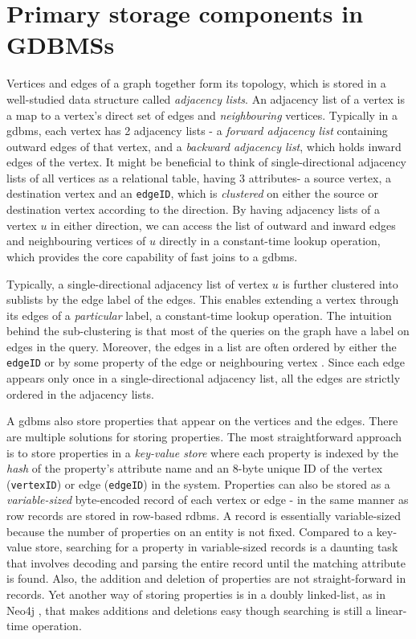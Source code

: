 \section{Primary storage components in GDBMSs}
\label{sec:storage-components}

Vertices and edges of a graph together form its topology, which is stored in a well-studied data structure called \emph{adjacency lists}. An adjacency list of a vertex is a map to a vertex's direct set of edges and \emph{neighbouring} vertices. Typically in a \gls{gdbms}, each vertex has 2 adjacency lists - a \emph{forward adjacency list} containing outward edges of that vertex, and a \emph{backward adjacency list}, which holds inward edges of the vertex. It might be beneficial to think of single-directional adjacency lists of all vertices as a relational table, having 3 attributes- a source vertex, a destination vertex and an \texttt{edgeID}, which is \emph{clustered} on either the source or destination vertex according to the direction. By having adjacency lists of a vertex $u$ in either direction, we can access the list of outward and inward edges and neighbouring vertices of $u$ directly in a constant-time lookup operation, which provides the core capability of fast joins to a \gls{gdbms}. 

Typically, a single-directional adjacency list of vertex $u$ is further clustered into sublists by the edge label of the edges. This enables extending a vertex through its edges of a \emph{particular} label, a constant-time lookup operation. The intuition behind the sub-clustering is that most of the queries on the graph have a label on edges in the query. Moreover, the edges in a list are often ordered by either the \texttt{edgeID} or by some property of the edge or neighbouring vertex \cite{a+indexes}. Since each edge appears only once in a single-directional adjacency list, all the edges are strictly ordered in the adjacency lists.

A \gls{gdbms} also store properties that appear on the vertices and the edges. There are multiple solutions for storing properties. The most straightforward approach is to store properties in a \emph{key-value store} where each property is indexed by the \emph{hash} of the property's attribute name and an 8-byte unique ID of the vertex (\texttt{vertexID}) or edge (\texttt{edgeID}) in the system. Properties can also be stored as a \emph{variable-sized} byte-encoded record of each vertex or edge - in the same manner as row records are stored in row-based \gls{rdbms}. A record is essentially variable-sized because the number of properties on an entity is not fixed. Compared to a key-value store, searching for a property in variable-sized records is a daunting task that involves decoding and parsing the entire record until the matching attribute is found. Also, the addition and deletion of properties are not straight-forward in records. Yet another way of storing properties is in a doubly linked-list, as in Neo4j \cite{neo4j}, that makes additions and deletions easy though searching is still a linear-time operation.

